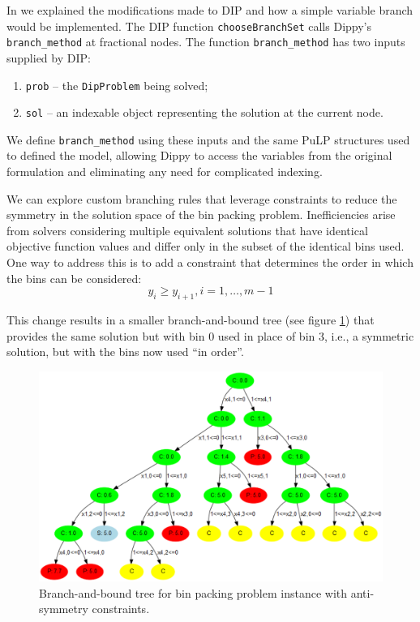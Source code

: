 \begin{sloppypar}In  we explained the modifications made to \ac{DIP} and how a simple variable branch would be implemented.
The \ac{DIP} function \lstinline{chooseBranchSet} calls Dippy's \lstinline{branch_method} at fractional nodes.
The function \lstinline{branch_method} has two inputs supplied by \ac{DIP}:
\begin{enumerate}
\item \lstinline{prob} -- the \lstinline{DipProblem} being solved;
\item \lstinline{sol} -- an indexable object representing the solution at the current node.
\end{enumerate}
We define \lstinline{branch_method} using these inputs and the same PuLP structures used to defined the model, allowing Dippy to access the variables from the original formulation and eliminating any need for complicated indexing.\end{sloppypar}

We can explore custom branching rules that leverage constraints to reduce the symmetry in the solution space of the bin packing problem.
Inefficiencies arise from solvers considering multiple equivalent solutions that have identical objective function values and differ only in the subset of the identical bins used.
One way to address this is to add a constraint that determines the order in which the bins can be considered:
\[ y_i \geq y_{i+1}, i = 1, \ldots, m-1 \]

This change results in a smaller branch-and-bound tree (see figure \ref{fig:bpp_tree2}) that provides the same solution but with bin 0 used in place of bin 3, i.e., a symmetric solution, but with the bins now used ``in order''.
\begin{figure}[htp]
\begin{center}
\includegraphics[scale=0.11]{img/bpp_tree2.eps}
\end{center}
\caption{Branch-and-bound tree for bin packing problem instance with anti-symmetry constraints.} \label{fig:bpp_tree2}
\end{figure}

